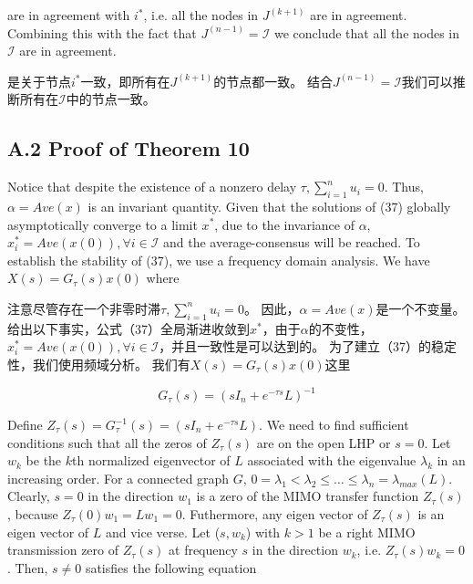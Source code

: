 \documentclass{article}
\begin{document}
{\color[gray]{0.5}
\noindent are in agreement with $i^*$, i.e. all the nodes in $J^{(k+1)}$ are in agreement. 
Combining this with the fact that $J^{(n-1)}=\mathcal{I}$ we conclude that all the nodes in $\mathcal{I}$ are in agreement.
}

\noindent 是关于节点$i^*$一致，即所有在$J^{(k+1)}$的节点都一致。
结合$J^{(n-1)}=\mathcal{I}$我们可以推断所有在$\mathcal{I}$中的节点一致。

\subsection*{A.2 Proof of Theorem 10}

{\color[gray]{0.5}
\noindent Notice that despite the existence of a nonzero delay $\tau, \sum_{i=1}^{n} u_i=0$. 
Thus, $\alpha=Ave(x)$ is an invariant quantity. 
Given that the solutions of (37) globally asymptotically converge to a limit $x^*$, due to the invariance of $\alpha$, $x_i^*=Ave(x(0)), \forall i \in \mathcal{I}$ and the average-consensus will be reached. 
To establish the stability of (37), we use a frequency domain analysis. 
We have $X(s) = G_{\tau}(s)x(0)$ where
}

\noindent 注意尽管存在一个非零时滞$\tau, \sum_{i=1}^{n} u_i=0$。
因此，$\alpha=Ave(x)$是一个不变量。
给出以下事实，公式（37）全局渐进收敛到$x^*$，由于$\alpha$的不变性，$x_i^*=Ave(x(0)), \forall i \in \mathcal{I}$，并且一致性是可以达到的。
为了建立（37）的稳定性，我们使用频域分析。
我们有$X(s) = G_{\tau}(s)x(0)$这里

\begin{equation}
    \tag{51}
    \label{51}
    G_{\tau}(s) = (sI_n + e^{-\tau s}L)^{-1}
\end{equation}

{\color[gray]{0.5}
\noindent Define $Z_{\tau}(s) = G_{\tau}^{-1}(s) = (sI_n + e^{-\tau s}L)$. 
We need to find sufficient conditions such that all the zeros of $Z_{\tau}(s)$ are on the open LHP or $s=0$. 
Let $w_k$ be the $k$th normalized eigenvector of $L$ associated with the eigenvalue $\lambda_k$ in an increasing order. 
For a connected graph $G$, $0=\lambda_1 < \lambda_2 \le \dots \le \lambda_n =\lambda_{max}(L)$. 
Clearly, $s=0$ in the direction $w_1$ is a zero of the MIMO transfer function $Z_{\tau}(s)$, because $Z_{\tau}(0)w_1 = Lw_1 = 0$. 
Futhermore, any eigen vector of $Z_{\tau}(s)$ is an eigen vector of $L$ and vice verse. 
Let ($s,w_k$) with $k>1$ be a right MIMO transmission zero of $Z_{\tau}(s)$ at frequency $s$ in the direction $w_k$, i.e. $Z_{\tau}(s)w_k=0$. 
Then, $s\ne0$ satisfies the following equation
}
\end{document}
